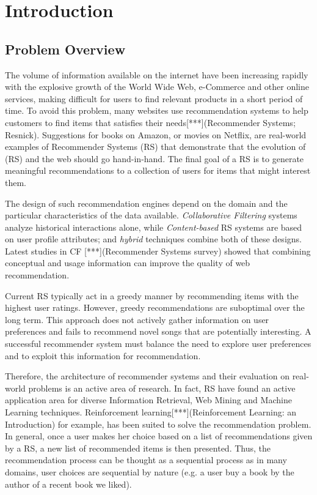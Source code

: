 \chapter{Introduction}
\label{chapterlabel1}

\section{Problem Overview}

The volume of information available on the internet have been increasing rapidly with the explosive growth of the World Wide Web, e-Commerce and other online services, making difficult for users to find relevant products in a short period of time. To avoid this problem, many websites use recommendation systems to help customers to find items that satisfies their needs[***](Recommender Systems; Resnick). Suggestions for books on Amazon, or movies on Netflix, are real-world examples of Recommender Systems (RS) that demonstrate that the evolution of (RS) and the web should go hand-in-hand. The final goal of a RS is to generate meaningful recommendations to a collection of users for items that might interest them. 

The design of such recommendation engines depend on the domain and the particular characteristics of the data available. \textit{Collaborative Filtering} systems analyze historical interactions alone, while \textit{Content-based} RS systems are based on user profile attributes; and \textit{hybrid} techniques combine both of these designs. Latest studies in CF [***](Recommender Systems survey) showed that combining conceptual and usage information can improve the quality of web recommendation.

Current RS typically act in a greedy manner by recommending items with the highest user ratings. However, greedy recommendations are suboptimal over the long term. This approach does not actively gather information on user preferences and fails to recommend novel songs that are potentially interesting. A successful recommender system must balance the need to explore user preferences and to exploit this information for recommendation.

Therefore, the architecture of recommender systems and their evaluation on real-world problems is an active area of research. In fact, RS have found an active application area for diverse Information Retrieval, Web Mining and Machine Learning techniques. Reinforcement learning[***](Reinforcement Learning: an Introduction) for example, has been suited to solve the recommendation problem. In general, once a user makes her choice based on a list of recommendations given by a RS, a new list of recommended items is then presented. Thus, the recommendation process can be thought as a sequential process as in many domains, user choices are sequential by nature (e.g. a user buy a book by the author of a recent book we liked). 


